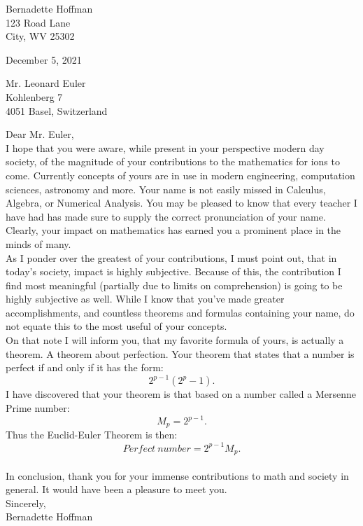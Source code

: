 \documentclass[oneside]{book}
\begin{document}
\begin{flushleft}

Bernadette Hoffman\\
123 Road Lane\\
City, WV 25302\\
\vspace{.25in}

December 5, 2021\\
\vspace{.25in}

Mr. Leonard Euler\\
Kohlenberg 7 \\
4051 Basel, Switzerland\\
\vspace{.25in}

Dear Mr. Euler,\\

I hope that you were aware, while present in your perspective modern day society, of the magnitude of your contributions to the mathematics for ions to come. Currently concepts of yours are in use in modern engineering, computation sciences, astronomy and more. Your name is not easily missed in Calculus, Algebra, or Numerical Analysis. You may be pleased to know that every teacher I have had has made sure to supply the correct pronunciation of your name. Clearly, your impact on mathematics has earned you a prominent place in the minds of many. \\
\bigskip
As I ponder over the greatest of your contributions, I must point out, that in today's society, impact is highly subjective. Because of this, the contribution I find most meaningful (partially due to limits on comprehension) is going to be highly subjective as well. While I know that you've made greater accomplishments, and countless theorems and formulas containing your name, do not equate this to the most useful of your concepts. \\
\bigskip
On that note I will inform you, that my favorite formula of yours, is actually a theorem. A theorem about perfection. Your theorem that states that a number is perfect if and only if it has the form:
$$2^{p-1}(2^p-1).$$
I have discovered that your theorem is that based on a number called a Mersenne Prime number:
$$M_p=2^{p-1}.$$
Thus the Euclid-Euler Theorem is then:
$$Perfect \ number = 2^{p-1}M_p.$$\\
\bigskip
In conclusion, thank you for your immense contributions to math and society in general. It would have been a pleasure to meet you.\\
\vspace{.25in}
Sincerely, \\
\bigskip
Bernadette Hoffman
\end{flushleft}

\cite{Letters}

\newpage


\printbibliography[heading = bibintoc, title={References}]
\end{document}

